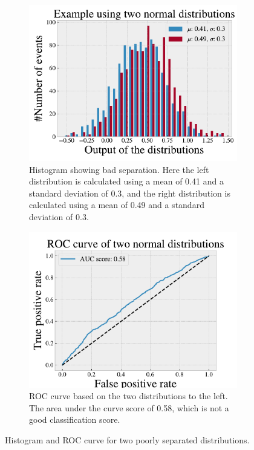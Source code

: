 \begin{figure}[H]
    \centering
    \begin{subfigure}{.45\textwidth}
        \includegraphics[width=\textwidth]{Figures/Machinelearning/histo_example_bad.pdf}
        \caption{Histogram showing bad separation. Here the left distribution is calculated using a mean of 0.41 and a standard 
        deviation of 0.3, and the right distribution is calculated using a mean of 0.49 and a standard deviation of 0.3.}
        \label{fig:dist_ex_bad}
    \end{subfigure}
    \hfill
    \begin{subfigure}{.45\textwidth}
        \includegraphics[width=\textwidth]{Figures/Machinelearning/ROC_curve_example_bad.pdf}
        \caption{ROC curve based on the two distributions to the left. The area under the curve score of 0.58, which is not a good classification score.}
        \label{fig:ROC_curve_ex_bad}
    \end{subfigure}
    \hfill        
    \caption{Histogram and ROC curve for two poorly separated distributions.}
    \label{fig:roc_example_bad}
\end{figure}

